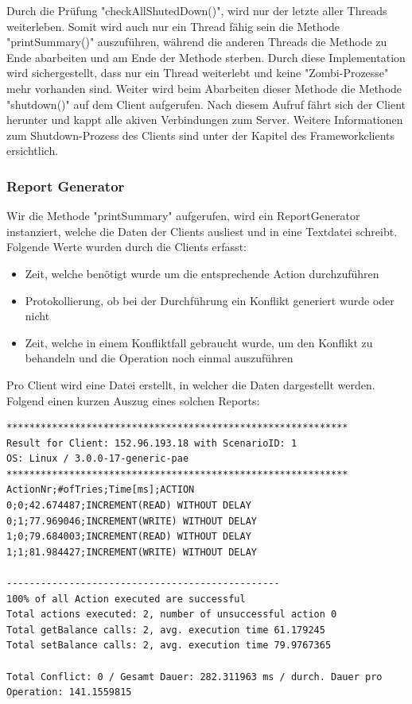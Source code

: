 Durch die Prüfung "checkAllShutedDown()", wird nur der letzte aller Threads weiterleben. Somit wird auch nur ein Thread fähig sein die Methode "printSummary()" auszuführen, während die anderen Threads die Methode zu Ende abarbeiten und am Ende der Methode sterben. Durch diese Implementation wird sichergestellt, dass nur ein Thread weiterlebt und keine "Zombi-Prozesse" mehr vorhanden sind.\newline
Weiter wird beim Abarbeiten dieser Methode die Methode "shutdown()" auf dem Client aufgerufen. Nach diesem Aufruf fährt sich der Client herunter und kappt alle akiven Verbindungen zum Server. Weitere Informationen zum Shutdown-Prozess des Clients sind unter der Kapitel des Frameworkclients ersichtlich.

\subsubsection{Report Generator}
\label{sec:reportGenerator}

Wir die Methode "printSummary" aufgerufen, wird ein ReportGenerator instanziert, welche die Daten der Clients ausliest und in eine Textdatei schreibt. Folgende Werte wurden durch die Clients erfasst:
\begin{itemize}
\item Zeit, welche benötigt wurde um die entsprechende Action durchzuführen
\item Protokollierung, ob bei der Durchführung ein Konflikt generiert wurde oder nicht
\item Zeit, welche in einem Konfliktfall gebraucht wurde, um den Konflikt zu behandeln und die Operation noch einmal auszuführen
\end{itemize}

Pro Client wird eine Datei erstellt, in welcher die Daten dargestellt werden. Folgend einen kurzen Auszug eines solchen Reports:

\begin{lstlisting}
************************************************************
Result for Client: 152.96.193.18 with ScenarioID: 1
OS: Linux / 3.0.0-17-generic-pae
************************************************************
ActionNr;#ofTries;Time[ms];ACTION
0;0;42.674487;INCREMENT(READ) WITHOUT DELAY
0;1;77.969046;INCREMENT(WRITE) WITHOUT DELAY
1;0;79.684003;INCREMENT(READ) WITHOUT DELAY
1;1;81.984427;INCREMENT(WRITE) WITHOUT DELAY

------------------------------------------------
100% of all Action executed are successful
Total actions executed: 2, number of unsuccessful action 0
Total getBalance calls: 2, avg. execution time 61.179245
Total setBalance calls: 2, avg. execution time 79.9767365

Total Conflict: 0 / Gesamt Dauer: 282.311963 ms / durch. Dauer pro Operation: 141.1559815
\end{lstlisting}

